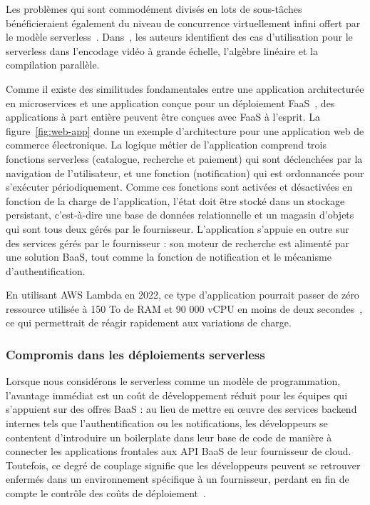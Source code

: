 Les problèmes qui sont commodément divisés en lots de sous-tâches bénéficieraient également du niveau de concurrence virtuellement infini offert par le modèle serverless~\cite{golecIFaaSBusSecurityPrivacyBased2022}. Dans~\cite{agacheFirecrackerLightweightVirtualization}, les auteurs identifient des cas d'utilisation pour le serverless dans l'encodage vidéo à grande échelle, l'algèbre linéaire et la compilation parallèle.

Comme il existe des similitudes fondamentales entre une application architecturée en microservices et une application conçue pour un déploiement FaaS~\cite{jiaNightcoreEfficientScalable2021}, des applications à part entière peuvent être conçues avec FaaS à l'esprit. La figure~\ref{fig:web-app} donne un exemple d'architecture pour une application web de commerce électronique. La logique métier de l'application comprend trois fonctions serverless (catalogue, recherche et paiement) qui sont déclenchées par la navigation de l'utilisateur, et une fonction (notification) qui est ordonnancée pour s'exécuter périodiquement. Comme ces fonctions sont activées et désactivées en fonction de la charge de l'application, l'état doit être stocké dans un stockage persistant, c'est-à-dire une base de données relationnelle et un magasin d'objets qui sont tous deux gérés par le fournisseur. L'application s'appuie en outre sur des services gérés par le fournisseur : son moteur de recherche est alimenté par une solution BaaS, tout comme la fonction de notification et le mécanisme d'authentification.

En utilisant AWS Lambda en 2022, ce type d'application pourrait passer de zéro ressource utilisée à 150 To de RAM et 90 000 vCPU en moins de deux secondes~\cite{ionescu2022scaling}, ce qui permettrait de réagir rapidement aux variations de charge.

\subsubsection{Compromis dans les déploiements serverless}

Lorsque nous considérons le serverless comme un modèle de programmation, l'avantage immédiat est un coût de développement réduit pour les équipes qui s'appuient sur des offres BaaS : au lieu de mettre en œuvre des services backend internes tels que l'authentification ou les notifications, les développeurs se contentent d'introduire un boilerplate dans leur base de code de manière à connecter les applications frontales aux API BaaS de leur fournisseur de cloud. Toutefois, ce degré de couplage signifie que les développeurs peuvent se retrouver enfermés dans un environnement spécifique à un fournisseur, perdant en fin de compte le contrôle des coûts de déploiement~\cite{baarziMeritsViabilityMultiCloud2021}.

